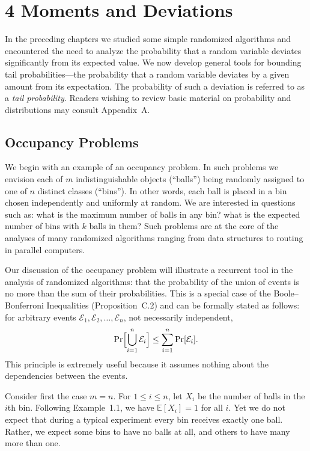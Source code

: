 \documentclass[twoside,12pt]{book}
\theoremstyle{plain}
\theoremstyle{definition}
\theoremstyle{remark}
\begin{document}
\chapter*{4 Moments and Deviations}
\label{ch:moments}

In the preceding chapters we studied some simple randomized algorithms and encountered the need to analyze the probability that a random variable deviates significantly from its expected value. We now develop general tools for bounding tail probabilities---the probability that a random variable deviates by a given amount from its expectation. The probability of such a deviation is referred to as a \emph{tail probability}. Readers wishing to review basic material on probability and distributions may consult Appendix~A.

\section{Occupancy Problems}
\label{sec:occupancy}

We begin with an example of an occupancy problem. In such problems we envision each of $m$ indistinguishable objects (``balls'') being randomly assigned to one of $n$ distinct classes (``bins''). In other words, each ball is placed in a bin chosen independently and uniformly at random. We are interested in questions such as: what is the maximum number of balls in any bin? what is the expected number of bins with $k$ balls in them? Such problems are at the core of the analyses of many randomized algorithms ranging from data structures to routing in parallel computers.

Our discussion of the occupancy problem will illustrate a recurrent tool in the analysis of randomized algorithms: that the probability of the union of events is no more than the sum of their probabilities. This is a special case of the Boole--Bonferroni Inequalities (Proposition~C.2) and can be formally stated as follows: for arbitrary events $\mathcal{E}_1, \mathcal{E}_2, \ldots, \mathcal{E}_n$, not necessarily independent,
\[
\Pr\Bigl[\bigcup_{i=1}^{n} \mathcal{E}_i\Bigr] \leq \sum_{i=1}^{n} \Pr[\mathcal{E}_i].
\]
This principle is extremely useful because it assumes nothing about the dependencies between the events.

Consider first the case $m = n$. For $1 \leq i \leq n$, let $X_i$ be the number of balls in the $i$th bin. Following Example~1.1, we have $\mathbb{E}[X_i] = 1$ for all $i$. Yet we do not expect that during a typical experiment every bin receives exactly one ball. Rather, we expect some bins to have no balls at all, and others to have many more than one.
\end{document}

